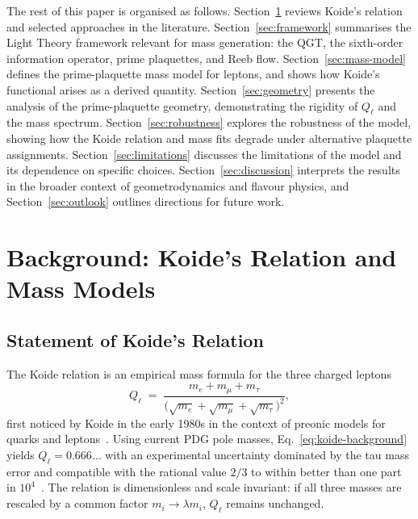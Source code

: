 \documentclass[12pt]{article}
\begin{document}
The rest of this paper is organised as follows.
Section~\ref{sec:background} reviews Koide's relation and selected
approaches in the literature.
Section~\ref{sec:framework} summarises the Light Theory framework
relevant for mass generation: the QGT, the sixth-order information
operator, prime plaquettes, and Reeb flow.
Section~\ref{sec:mass-model} defines the prime-plaquette mass model
for leptons, and shows how Koide's functional arises as a derived
quantity.
Section~\ref{sec:geometry} presents the analysis of the prime-plaquette
geometry, demonstrating the rigidity of $Q_\ell$ and the mass spectrum.
Section~\ref{sec:robustness} explores the robustness of the model,
showing how the Koide relation and mass fits degrade under alternative
plaquette assignments.
Section~\ref{sec:limitations} discusses the limitations of the model
and its dependence on specific choices.
Section~\ref{sec:discussion} interprets the results in the broader
context of geometrodynamics and flavour physics, and
Section~\ref{sec:outlook} outlines directions for future work.

\section{Background: Koide's Relation and Mass Models}
\label{sec:background}

\subsection{Statement of Koide's Relation}

The Koide relation is an empirical mass formula for the three charged leptons
\begin{equation}
  Q_\ell \;=\;
  \frac{m_e + m_\mu + m_\tau}
       {\bigl(\sqrt{m_e} + \sqrt{m_\mu} + \sqrt{m_\tau}\bigr)^2},
  \label{eq:koide-background}
\end{equation}
first noticed by Koide in the early 1980s in the context of preonic models for
quarks and leptons~\cite{Koide1981,Koide1983}.  Using current PDG pole masses,
Eq.~\eqref{eq:koide-background} yields
$Q_\ell = 0.666\dots$ with an experimental uncertainty dominated by the tau
mass error and compatible with the rational value $2/3$ to within better than
one part in $10^4$~\cite{PDG2024,RiveroKoideReview}.  The relation is
dimensionless and scale invariant: if all three masses are rescaled by a common
factor $m_i \to \lambda m_i$, $Q_\ell$ remains unchanged.
\end{document}

